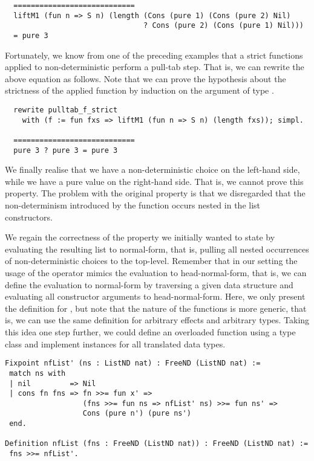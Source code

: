 \begin{verbatim}
  ============================
  liftM1 (fun n => S n) (length (Cons (pure 1) (Cons (pure 2) Nil)
                                ? Cons (pure 2) (Cons (pure 1) Nil)))
  = pure 3
\end{verbatim}

Fortunately, we know from one of the preceding examples that a strict functions applied to non-deterministic perform a pull-tab step.
That is, we can rewrite the above equation as follows.
Note that we can prove the hypothesis about the strictness of the applied function  by induction on the argument of type .

\begin{verbatim}
  rewrite pulltab_f_strict
    with (f := fun fxs => liftM1 (fun n => S n) (length fxs)); simpl.

  ============================
  pure 3 ? pure 3 = pure 3
\end{verbatim}

We finally realise that we have a non-deterministic choice on the left-hand side, while we have a pure value on the right-hand side.
That is, we cannot prove this property.
The problem with the original property is that we disregarded that the non-determinism introduced by the function  occurs nested in the list constructors.

We regain the correctness of the property we initially wanted to state by evaluating the resulting list to normal-form, that is, pulling all nested occurrences of non-deterministic choices to the top-level.
Remember that in our setting the usage of the operator \cinl{>>=} mimics the evaluation to head-normal-form, that is, we can define the evaluation to normal-form by traversing a given data structure and evaluating all constructor arguments to head-normal-form.
Here, we only present the definition for , but note that the nature of the functions is more generic, that is, we can use the same definition for arbitrary effects and arbitrary types.
Taking this idea one step further, we could define an overloaded function  using a type class and implement instances for all translated data types.

\begin{verbatim}
Fixpoint nfList' (ns : ListND nat) : FreeND (ListND nat) :=
 match ns with
 | nil         => Nil
 | cons fn fns => fn >>= fun x' =>
                  (fns >>= fun ns => nfList' ns) >>= fun ns' =>
                  Cons (pure n') (pure ns')
 end.

Definition nfList (fns : FreeND (ListND nat)) : FreeND (ListND nat) :=
 fns >>= nfList'.
\end{verbatim}


